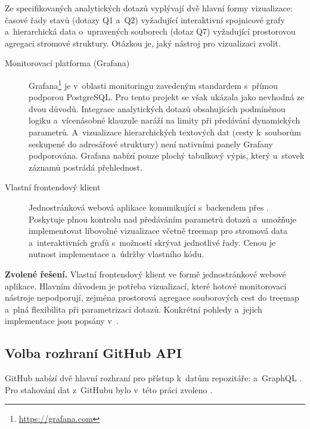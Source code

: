 Ze specifikovaných analytických dotazů vyplývají dvě hlavní formy vizualizace: časové řady stavů \PR (dotazy Q1 a~Q2) vyžadující interaktivní spojnicové grafy a~hierarchická data o~upravených souborech (dotaz Q7) vyžadující prostorovou agregaci stromové struktury. Otázkou je, jaký nástroj pro vizualizaci zvolit.

\begin{description}
  \item[Monitorovací platforma (Grafana)]
    Grafana\footnote{\url{https://grafana.com}} je v~oblasti monitoringu zavedeným standardem s~přímou podporou PostgreSQL. Pro tento projekt se však ukázala jako nevhodná ze dvou důvodů. Integrace analytických \SQL dotazů obsahujících podmíněnou logiku a~vícenásobné klauzule  naráží na limity při předávání dynamických parametrů. A~vizualizace hierarchických textových dat (cesty k~souborům seskupené do adresářové struktury) není nativními panely Grafany podporována. Grafana nabízí pouze plochý tabulkový výpis, který u~stovek záznamů postrádá přehlednost.

  \item[Vlastní frontendový klient]
    Jednostránková webová aplikace komunikující s~backendem přes \REST \API. Poskytuje plnou kontrolu nad předáváním parametrů dotazů a~umožňuje implementovat libovolné vizualizace včetně treemap pro stromová data a~interaktivních grafů s~možností skrývat jednotlivé řady. Cenou je nutnost implementace a~údržby vlastního kódu.
\end{description}

\textbf{Zvolené řešení.} Vlastní frontendový klient ve formě jednostránkové webové aplikace. Hlavním důvodem je potřeba vizualizací, které hotové monitorovací nástroje nepodporují, zejména prostorová agregace souborových cest do treemap a~plná flexibilita při parametrizaci dotazů. Konkrétní pohledy a~jejich implementace jsou popsány v~.

\subsection{Volba rozhraní GitHub API}
\label{subsec:decisions:github_api}

GitHub nabízí dvě hlavní rozhraní pro přístup k~datům repozitáře: \REST \API {} a~GraphQL \API {}. Pro stahování dat z~GitHubu bylo v~této práci zvoleno \REST \API.


